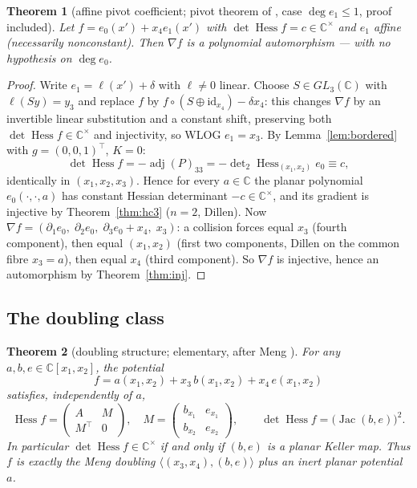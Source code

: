 \documentclass[11pt]{article}
\theoremstyle{plain}
\newtheorem{theorem}{Theorem}[section]
\theoremstyle{definition}
\newcommand{\C}{\mathbb{C}}
\newcommand{\Hess}{\operatorname{Hess}}
\newcommand{\adj}{\operatorname{adj}}
\newcommand{\Jac}{\operatorname{Jac}}
\begin{document}
\begin{theorem}[affine pivot coefficient; pivot theorem of
\cite{companion}, case $\deg e_1\le1$, proof included]\label{thm:aff}
Let $f=e_0(x')+x_4e_1(x')$ with $\det\Hess f=c\in\C^{\times}$ and $e_1$
affine (necessarily nonconstant). Then $\nabla f$ is a polynomial
automorphism --- with no hypothesis on $\deg e_0$.
\end{theorem}

\begin{proof}
Write $e_1=\ell(x')+\delta$ with $\ell\ne0$ linear. Choose $S\in
GL_3(\C)$ with $\ell(Sy)=y_3$ and replace $f$ by
$f\circ(S\oplus\mathrm{id}_{x_4})-\delta x_4$: this changes $\nabla f$ by
an invertible linear substitution and a constant shift, preserving both
$\det\Hess f\in\C^{\times}$ and injectivity, so WLOG $e_1=x_3$. By
Lemma~\ref{lem:bordered} with $g=(0,0,1)^{\top}$, $K=0$:
\[
\det\Hess f=-\adj(P)_{33}=-\det\nolimits_2\Hess_{(x_1,x_2)}e_0\equiv c ,
\]
identically in $(x_1,x_2,x_3)$. Hence for every $a\in\C$ the planar
polynomial $e_0(\cdot,\cdot,a)$ has constant Hessian determinant
$-c\in\C^{\times}$, and its gradient is injective by
Theorem~\ref{thm:hc3} ($n=2$, Dillen). Now
$\nabla f=(\partial_1e_0,\;\partial_2e_0,\;\partial_3e_0+x_4,\;x_3)$: a
collision forces equal $x_3$ (fourth component), then equal $(x_1,x_2)$
(first two components, Dillen on the common fibre $x_3=a$), then equal
$x_4$ (third component). So $\nabla f$ is injective, hence an
automorphism by Theorem~\ref{thm:inj}.
\end{proof}

\subsection{The doubling class}

\begin{theorem}[doubling structure; elementary, after Meng
\cite{Meng2006}]\label{thm:doubling}
For any $a,b,e\in\C[x_1,x_2]$, the potential
\[
f=a(x_1,x_2)+x_3\,b(x_1,x_2)+x_4\,e(x_1,x_2)
\]
satisfies, independently of $a$,
\[
\Hess f=\begin{pmatrix}A&M\\ M^{\top}&0\end{pmatrix},\quad
M=\begin{pmatrix}b_{x_1}&e_{x_1}\\ b_{x_2}&e_{x_2}\end{pmatrix},
\qquad
\det\Hess f=\bigl(\Jac(b,e)\bigr)^2 .
\]
In particular $\det\Hess f\in\C^{\times}$ if and only if $(b,e)$ is a
planar Keller map. Thus $f$ is exactly the Meng doubling
$\langle(x_3,x_4),(b,e)\rangle$ plus an inert planar potential $a$.
\end{theorem}
\end{document}
